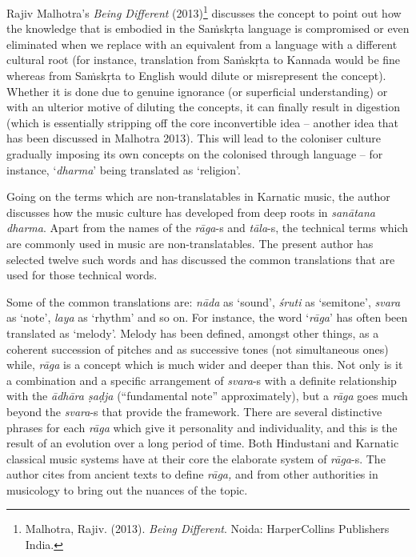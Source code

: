Rajiv Malhotra’s \textit{Being Different} (2013)\footnote{Malhotra, Rajiv. (2013). \textit{Being Different}. Noida: HarperCollins Publishers India.} discusses the concept to point out how the knowledge that is embodied in the Saṁskṛta language is compromised or even eliminated when we replace with an equivalent from a language with a different cultural root (for instance, translation from Saṁskṛta to Kannada would be fine whereas from Saṁskṛta to English would dilute or misrepresent the concept). Whether it is done due to genuine ignorance (or superficial understanding) or with an ulterior motive of diluting the concepts, it can finally result in digestion (which is essentially stripping off the core inconvertible idea – another idea that has been discussed in Malhotra 2013). This will lead to the coloniser culture gradually imposing its own concepts on the colonised through language – for instance, ‘\textit{dharma}’ being translated as ‘religion’.

Going on the terms which are non-translatables in Karnatic music, the author discusses how the music culture has developed from deep roots in \textit{sanātana dharma}. Apart from the names of the \textit{rāga}-s and \textit{tāla}-s, the technical terms which are commonly used in music are non-translatables. The present author has selected twelve such words and has discussed the common translations that are used for those technical words.

Some of the common translations are: \textit{nāda} as ‘sound’, \textit{śruti} as ‘semitone’, \textit{svara} as ‘note’, \textit{laya} as ‘rhythm’ and so on. For instance, the word ‘\textit{rāga}’ has often been translated as ‘melody’. Melody has been defined, amongst other things, as a coherent succession of pitches and as successive tones (not simultaneous ones) while, \textit{rāga} is a concept which is much wider and deeper than this. Not only is it a combination and a specific arrangement of \textit{svara}-s with a definite relationship with the \textit{ādhāra ṣaḍja} (“fundamental note” approximately), but a \textit{rāga} goes much beyond the \textit{svara}-s that provide the framework. There are several distinctive phrases for each \textit{rāga} which give it personality and individuality, and this is the result of an evolution over a long period of time. Both Hindustani and Karnatic classical music systems have at their core the elaborate system of \textit{rāga}-s. The author cites from ancient texts to define \textit{rāga,} and from other authorities in musicology to bring out the nuances of the topic.

